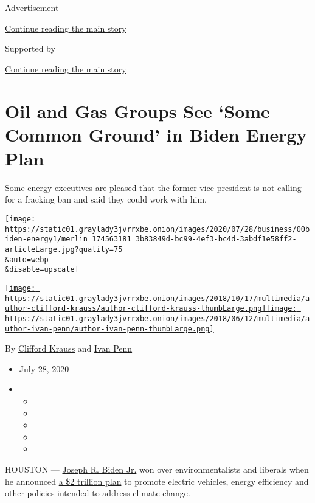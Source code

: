 Advertisement

\protect\hyperlink{after-top}{Continue reading the main story}

Supported by

\protect\hyperlink{after-sponsor}{Continue reading the main story}

\hypertarget{oil-and-gas-groups-see-some-common-ground-in-biden-energy-plan}{%
\section{Oil and Gas Groups See `Some Common Ground' in Biden Energy
Plan}\label{oil-and-gas-groups-see-some-common-ground-in-biden-energy-plan}}

Some energy executives are pleased that the former vice president is not
calling for a fracking ban and said they could work with him.

\texttt{[image: https://static01.graylady3jvrrxbe.onion/images/2020/07/28/business/00biden-energy1/merlin\_174563181\_3b83849d-bc99-4ef3-bc4d-3abdf1e58ff2-articleLarge.jpg?quality=75\\\&auto=webp\\\&disable=upscale]}

\href{https://www.nytimes3xbfgragh.onion/by/clifford-krauss}{\texttt{[image: https://static01.graylady3jvrrxbe.onion/images/2018/10/17/multimedia/author-clifford-krauss/author-clifford-krauss-thumbLarge.png]}}\href{https://www.nytimes3xbfgragh.onion/by/ivan-penn}{\texttt{[image: https://static01.graylady3jvrrxbe.onion/images/2018/06/12/multimedia/author-ivan-penn/author-ivan-penn-thumbLarge.png]}}

By \href{https://www.nytimes3xbfgragh.onion/by/clifford-krauss}{Clifford
Krauss} and \href{https://www.nytimes3xbfgragh.onion/by/ivan-penn}{Ivan
Penn}

\begin{itemize}
\item
  July 28, 2020
\item
  \begin{itemize}
  \item
  \item
  \item
  \item
  \item
  \end{itemize}
\end{itemize}

HOUSTON ---
\href{https://www.nytimes3xbfgragh.onion/interactive/2020/us/elections/joe-biden.html}{Joseph
R. Biden Jr.} won over environmentalists and liberals when he announced
\href{https://www.nytimes3xbfgragh.onion/2020/07/14/us/politics/biden-climate-plan.html}{a
\$2 trillion plan} to promote electric vehicles, energy efficiency and
other policies intended to address climate change.

